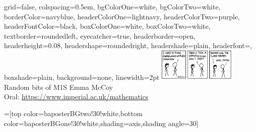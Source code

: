 \documentclass[landscape,final,a0paper]{baposter}
\begin{document}
\newlength{\leftimgwidth}
\begin{poster}%
  {
  grid=false,
  colspacing=0.5em,
  bgColorOne=white,
  bgColorTwo=white,
  borderColor=navyblue,
  headerColorOne=lightnavy,
  headerColorTwo=purple,
  headerFontColor=black,
 boxColorOne=white,
 boxColorTwo=white,
  textborder=roundedleft,
  eyecatcher=true,
  headerborder=open,
  headerheight=0.08\textheight,
  headershape=roundedright,
  headershade=plain,
  headerfont=\Large\textsf, %
  boxshade=plain,
  background=none,
  linewidth=2pt
  }
  {\includegraphics[width=10em]{correlationxkcd.png}} %
  {\sf %
  Random bits of M1S}
  {\sf %
  \vspace{1em} 
	Emma McCoy\\
	Oral:  \url{https://www.imperial.ac.uk/mathematics}
  }
  { %
  }

  =[top color=baposterBGtwo!30!white,bottom color=baposterBGone!30!white,shading=axis,shading angle=30]

     \setlength{\leftimgwidth}{0.78em+8.0em}


\end{poster}
\end{document}
